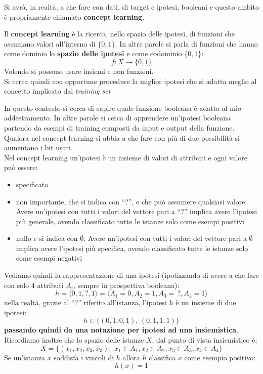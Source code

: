 \documentclass[a4paper,12pt, oneside]{book}
\begin{document}
Si avrà, in realtà, a che fare con dati, di target e ipotesi,
booleani e questo ambito è propriamente chiamato \textbf{concept learning}.
\begin{definizione}
  Il \textbf{concept learning} è la ricerca, nello spazio delle ipotesi, di
  funzioni che assumano valori all'interno di $\{0,1\}$. In altre parole si
  parla di funzioni che hanno come dominio lo \textbf{spazio delle ipotesi} e
  come codominio $\{0,1\}$:
  \[f:X\to\{0,1\}\]
  Volendo si possono usare insiemi e non funzioni.\\
  Si cerca quindi con opportune procedure la miglior ipotesi che si adatta
  meglio al concetto implicato dal \textit{training set}
\end{definizione}
In questo contesto si cerca di capire quale funzione booleana è adatta al mio
addestramento. In altre parole si cerca di apprendere un'ipotesi booleana
partendo da esempi di training composti da input e output della
funzione. Qualora nel concept learning si abbia a che fare con più di due 
possibilità si aumentano i bit usati.\\
Nel concept learning un'ipotesi è un insieme di valori di attributi e ogni
valore può essere:
\begin{itemize}
  \item specificato
  \item non importante, che si indica con ``?'', e che può assumere qualsiasi
  valore. Avere un'ipotesi con tutti i valori del vettore pari a ``?'' implica
  avere l'ipotesi più generale, avendo classificato tutte le istanze solo come
  esempi positivi 
  \item nullo e si indica con $\emptyset$. Avere un'ipotesi con tutti i valori
  del vettore pari a $\emptyset$ implica avere l'ipotesi più specifica, avendo
  classificato tutte le istanze solo come esempi negativi 
\end{itemize}
\begin{esempio}
  Vediamo quindi la rappresentazione di una ipotesi (ipotizzando di avere a che
  fare con solo 4 attributi $A_i$, sempre in prospettiva booleana):
  \[h=\langle 0, 1, ?, 1\rangle = \langle A_1=0, A_2=1, A_3=\,?, A_4=1\rangle\]
  nella realtà, grazie al ``?'' riferito all'istanza, l'ipotesi $h$ è un insieme
  di due ipotesi: 
  \[h\in\{(0, 1, 0, 1),\,(0, 1, 1, 1)\}\]
  \textbf{passando quindi da una notazione per ipotesi ad una insiemistica}.\\
  Ricordiamo inoltre che lo spazio delle istanze $X$, dal punto di vista
  insiemistico è:
  \[X=\{(x_1,x_2,x_3,x_3): \,\,x_1\in A_1,x_2\in A_2, x_3\in A_3, x_4\in A_4\}\]
  Se un'istanza $x$ soddisfa i vincoli di $h$ allora $h$ classifica $x$ come
  esempio positivo:
  \[h(x)=1\]
\end{esempio}
\end{document}
